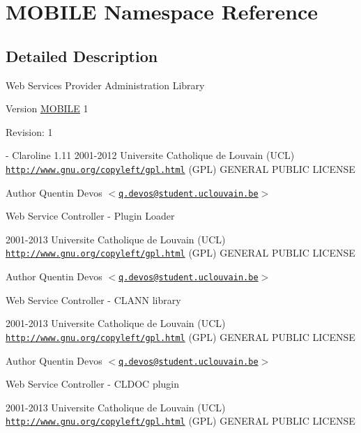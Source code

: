 \hypertarget{namespace_m_o_b_i_l_e}{
\section{MOBILE Namespace Reference}
\label{namespace_m_o_b_i_l_e}
}


\subsection{Detailed Description}
Web Services Provider Administration Library

\begin{DoxyVersion}{Version}
\hyperlink{namespace_m_o_b_i_l_e}{MOBILE} 1 
\end{DoxyVersion}
\begin{DoxyParagraph}{Revision:}
1 
\end{DoxyParagraph}
-\/ Claroline 1.11  2001-\/2012 Universite Catholique de Louvain (UCL)  \href{http://www.gnu.org/copyleft/gpl.html}{\tt http://www.gnu.org/copyleft/gpl.html} (GPL) GENERAL PUBLIC LICENSE

\begin{DoxyAuthor}{Author}
Quentin Devos $<$\href{mailto:q.devos@student.uclouvain.be}{\tt q.devos@student.uclouvain.be}$>$
\end{DoxyAuthor}
Web Service Controller -\/ Plugin Loader

2001-\/2013 Universite Catholique de Louvain (UCL)  \href{http://www.gnu.org/copyleft/gpl.html}{\tt http://www.gnu.org/copyleft/gpl.html} (GPL) GENERAL PUBLIC LICENSE

\begin{DoxyAuthor}{Author}
Quentin Devos $<$\href{mailto:q.devos@student.uclouvain.be}{\tt q.devos@student.uclouvain.be}$>$
\end{DoxyAuthor}
Web Service Controller -\/ CLANN library

2001-\/2013 Universite Catholique de Louvain (UCL)  \href{http://www.gnu.org/copyleft/gpl.html}{\tt http://www.gnu.org/copyleft/gpl.html} (GPL) GENERAL PUBLIC LICENSE

\begin{DoxyAuthor}{Author}
Quentin Devos $<$\href{mailto:q.devos@student.uclouvain.be}{\tt q.devos@student.uclouvain.be}$>$
\end{DoxyAuthor}
Web Service Controller -\/ CLDOC plugin

2001-\/2013 Universite Catholique de Louvain (UCL)  \href{http://www.gnu.org/copyleft/gpl.html}{\tt http://www.gnu.org/copyleft/gpl.html} (GPL) GENERAL PUBLIC LICENSE

